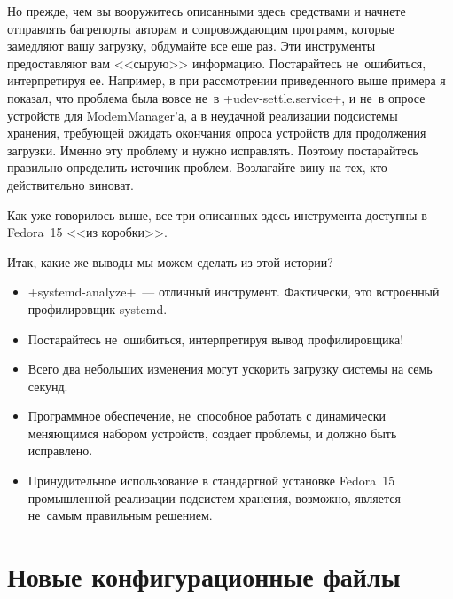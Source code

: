 \documentclass[10pt,oneside,a4paper]{article}
\begin{document}
Но прежде, чем вы вооружитесь описанными здесь средствами и начнете
отправлять багрепорты авторам и сопровождающим программ, которые замедляют вашу
загрузку, обдумайте все еще раз. Эти инструменты предоставляют вам <<сырую>>
информацию. Постарайтесь не~ошибиться, интерпретируя ее. Например, в
при рассмотрении приведенного выше примера я показал, что проблема была вовсе
не~в +udev-settle.service+, и не~в опросе устройств для ModemManager'а, а в 
неудачной реализации подсистемы хранения, требующей ожидать окончания опроса
устройств для продолжения загрузки. Именно эту проблему и нужно исправлять.
Поэтому постарайтесь правильно определить источник проблем. Возлагайте вину на
тех, кто действительно виноват.

Как уже говорилось выше, все три описанных здесь инструмента доступны в
Fedora~15 <<из коробки>>.

Итак, какие же выводы мы можем сделать из этой истории?
\begin{itemize}
	\item +systemd-analyze+~--- отличный инструмент. Фактически, это
		встроенный профилировщик systemd.
	\item Постарайтесь не~ошибиться, интерпретируя вывод профилировщика!
	\item Всего два небольших изменения могут ускорить загрузку системы на
		семь секунд.
	\item Программное обеспечение, не~способное работать с динамически
		меняющимся набором устройств, создает проблемы, и должно быть
		исправлено.
	\item Принудительное использование в стандартной установке Fedora~15
		промышленной реализации подсистем хранения, возможно, является
		не~самым правильным решением.
\end{itemize}

\section{Новые конфигурационные файлы}
\end{document}
